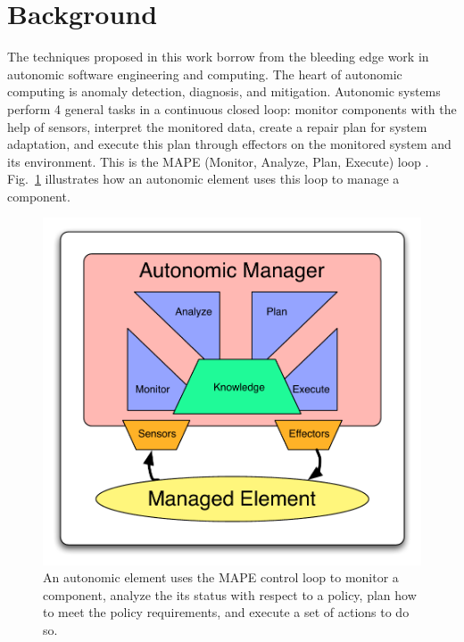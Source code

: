 \section{Background}
\label{sec:background}

The techniques proposed in this work borrow from the bleeding edge work in autonomic software engineering and computing.  The heart of autonomic computing is anomaly detection, diagnosis, and mitigation. Autonomic systems perform 4 general tasks in a continuous closed loop: monitor components with the help of sensors, interpret the monitored data, create a repair plan for system adaptation, and execute this plan through effectors on the monitored system and its environment. This is the MAPE (Monitor, Analyze, Plan, Execute) loop \cite{1160055}. Fig.~\ref{fig:mape} illustrates how an autonomic element uses this loop to manage a component.

\begin{figure}[tb]
  \centering
  \includegraphics[width=\columnwidth]{images/mape}
  \caption{An autonomic element uses the MAPE control loop to monitor a component, analyze the its status with respect to a policy, plan how to meet the policy requirements, and execute a set of actions to do so.}
	\label{fig:mape}
\end{figure}

